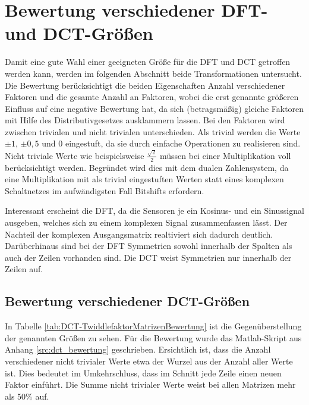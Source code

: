 \section{Bewertung verschiedener DFT- und DCT-Größen}\label{sec:BewertungVerschiedenerGroessen}
Damit eine gute Wahl einer geeigneten Größe für die DFT und DCT getroffen werden kann, werden im folgenden Abschnitt beide Transformationen untersucht.
Die Bewertung berücksichtigt die beiden Eigenschaften Anzahl verschiedener Faktoren und die gesamte Anzahl an Faktoren, wobei die erst genannte 
größeren Einfluss auf eine negative Bewertung hat, da sich (betragsmäßig) gleiche Faktoren mit Hilfe des Distributivgesetzes ausklammern lassen.
Bei den Faktoren wird zwischen trivialen und nicht trivialen unterschieden. 
Als trivial werden die Werte $\pm1$, $\pm0,5$ und $0$ eingestuft, da 
sie durch einfache Operationen zu realisieren sind. Nicht triviale Werte wie beispielsweise $\tfrac{\sqrt{2}}{2}$
müssen bei einer Multiplikation voll berücksichtigt werden.
Begründet wird dies mit dem dualen Zahlensystem, da eine Multiplikation mit als trivial eingestuften Werten statt eines 
komplexen Schaltnetzes im aufwändigsten Fall Bitshifts erfordern.

Interessant erscheint die DFT, da die Sensoren je ein Kosinus- und ein Sinussignal ausgeben, welches sich zu einem komplexen Signal zusammenfassen lässt. Der Nachteil der komplexen Ausgangsmatrix realtiviert sich dadurch deutlich. Darüberhinaus sind bei der DFT Symmetrien sowohl innerhalb der Spalten als auch der Zeilen vorhanden sind. Die DCT weist Symmetrien nur innerhalb der Zeilen auf.


\subsection{Bewertung verschiedener DCT-Größen}
In Tabelle \ref{tab:DCT-TwiddlefaktorMatrizenBewertung} ist die Gegenüberstellung der genannten Größen zu sehen. Für die Bewertung wurde das 
Matlab-Skript aus Anhang \ref{src:dct_bewertung} geschrieben.
Ersichtlich ist, dass die Anzahl verschiedener nicht trivialer Werte etwa der Wurzel aus der Anzahl aller Werte ist.
Dies bedeutet im Umkehrschluss, dass im Schnitt jede Zeile einen neuen Faktor einführt. Die Summe nicht trivialer Werte weist bei allen Matrizen
mehr als 50$\%$ auf. 

